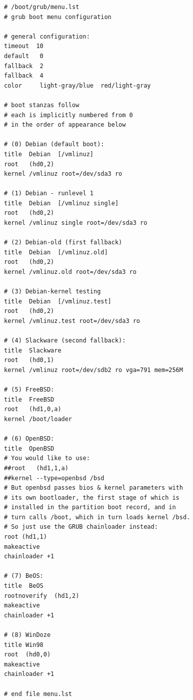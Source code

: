 \documentclass{article}
\begin{document}
\begin{verbatim}
# /boot/grub/menu.lst
# grub boot menu configuration

# general configuration:
timeout  10
default   0
fallback  2
fallback  4
color     light-gray/blue  red/light-gray

# boot stanzas follow
# each is implicitly numbered from 0
# in the order of appearance below

# (0) Debian (default boot):
title  Debian  [/vmlinuz]
root   (hd0,2)
kernel /vmlinuz root=/dev/sda3 ro

# (1) Debian - runlevel 1
title  Debian  [/vmlinuz single]
root   (hd0,2)
kernel /vmlinuz single root=/dev/sda3 ro

# (2) Debian-old (first fallback)
title  Debian  [/vmlinuz.old]
root   (hd0,2)
kernel /vmlinuz.old root=/dev/sda3 ro

# (3) Debian-kernel testing
title  Debian  [/vmlinuz.test]
root   (hd0,2)
kernel /vmlinuz.test root=/dev/sda3 ro

# (4) Slackware (second fallback):
title  Slackware
root   (hd0,1)
kernel /vmlinuz root=/dev/sdb2 ro vga=791 mem=256M

# (5) FreeBSD:
title  FreeBSD
root   (hd1,0,a)
kernel /boot/loader

# (6) OpenBSD:
title  OpenBSD
# You would like to use:
##root   (hd1,1,a)
##kernel --type=openbsd /bsd
# But openbsd passes bios & kernel parameters with
# its own bootloader, the first stage of which is
# installed in the partition boot record, and in
# turn calls /boot, which in turn loads kernel /bsd.
# So just use the GRUB chainloader instead:
root (hd1,1)
makeactive
chainloader +1

# (7) BeOS:
title  BeOS
rootnoverify  (hd1,2)
makeactive
chainloader +1

# (8) WinDoze
title Win98
root  (hd0,0)
makeactive
chainloader +1

# end file menu.lst

\end{verbatim}
\end{document}
